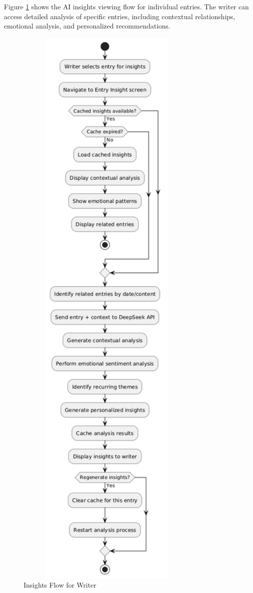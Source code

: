 Figure \ref{fig:insights-flow} shows the AI insights viewing flow for individual entries. The writer can access detailed analysis of specific entries, including contextual relationships, emotional analysis, and personalized recommendations.

\begin{figure}[H]
\centering
\includegraphics[width=0.8\textwidth]{files/imgs/insights_flow.png}
\caption{Insights Flow for Writer}
\label{fig:insights-flow}
\end{figure}

